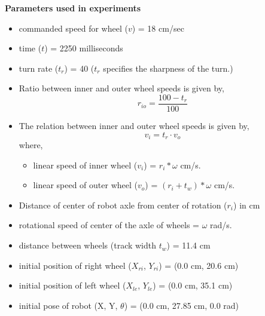 \textbf{Parameters used in experiments}
\begin{itemize}
	\item commanded speed for wheel ($v$) = 18 cm/sec
	\item time ($t$) = 2250 milliseconds
	\item turn rate ($t_r$) = 40 ($t_r$ specifies the sharpness of the turn.)
	\item Ratio between inner and outer wheel speeds is given by,
	\begin{equation}
	r_{io} = \frac{100 - t_r}{100}
	\end{equation}
	\item The relation between inner and outer wheel speeds is given by,
	\begin{equation}
	v_i = t_r \cdot v_o
	\end{equation}
	where,
	\begin{itemize}
	\item linear speed of inner wheel ($v_i$) = $r_i * \omega$ cm/s.
	\item linear speed of outer wheel ($v_o$) = $(r_i + t_w ) * \omega$ cm/s.
	\end{itemize}
	\item Distance of center of robot axle from center of rotation ($r_i$) in cm 
	\item rotational speed of center of the axle of wheels = $\omega$ rad/s.
	\item distance between wheels (track width $t_w$) = 11.4 cm 
	\item initial position of right wheel ($X_{ri}$, $Y_{ri}$) = (0.0 cm, 20.6 cm) 
	\item initial position of left wheel ($X_{le}$, $Y_{le}$) = (0.0 cm, 35.1 cm)
	\item initial pose of robot (X, Y, $\theta$) = (0.0 cm, 27.85 cm, 0.0 rad)
\end{itemize}

